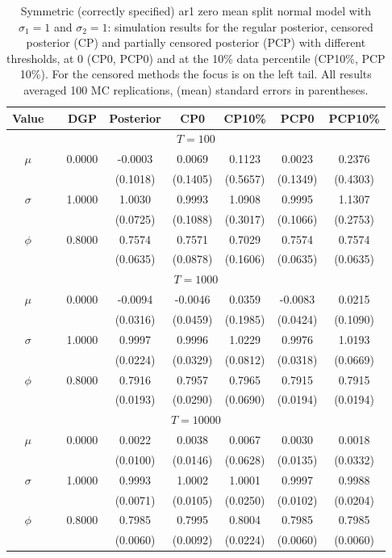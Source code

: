 { \renewcommand{\arraystretch}{1.2} 
{\footnotesize 
\begin{table} 
\center 
\begin{tabular}{cc cccccc} 
Value & & DGP & Posterior & CP0  & CP10\% & PCP0  & PCP10\% \\ \hline 
\hline 
\multicolumn{8}{c}{$T =100$}  \\ 
\hline 
\rowcolor{LightCyan} 
$\mu$&& 0.0000 & -0.0003 & 0.0069 & 0.1123 & 0.0023 & 0.2376 \\ 
&&   & (0.1018) & (0.1405) & (0.5657) & (0.1349) & (0.4303) \\ [1ex]
\rowcolor{LightCyan} 
$\sigma$&& 1.0000 & 1.0030 & 0.9993 & 1.0908 & 0.9995 & 1.1307 \\ 
&&   & (0.0725) & (0.1088) & (0.3017) & (0.1066) & (0.2753) \\ [1ex]
\rowcolor{LightCyan} 
$\phi$&& 0.8000 & 0.7574 & 0.7571 & 0.7029 & 0.7574 & 0.7574 \\ 
&&   & (0.0635) & (0.0878) & (0.1606) & (0.0635) & (0.0635) \\ [1ex]
\hline 
\multicolumn{8}{c}{$T =1000$}  \\ 
\hline 
\rowcolor{LightCyan} 
$\mu$&& 0.0000 & -0.0094 & -0.0046 & 0.0359 & -0.0083 & 0.0215 \\ 
&&   & (0.0316) & (0.0459) & (0.1985) & (0.0424) & (0.1090) \\ [1ex]
\rowcolor{LightCyan} 
$\sigma$&& 1.0000 & 0.9997 & 0.9996 & 1.0229 & 0.9976 & 1.0193 \\ 
&&   & (0.0224) & (0.0329) & (0.0812) & (0.0318) & (0.0669) \\ [1ex]
\rowcolor{LightCyan} 
$\phi$&& 0.8000 & 0.7916 & 0.7957 & 0.7965 & 0.7915 & 0.7915 \\ 
&&   & (0.0193) & (0.0290) & (0.0690) & (0.0194) & (0.0194) \\ [1ex]
\hline 
\multicolumn{8}{c}{$T =10000$}  \\ 
\hline 
\rowcolor{LightCyan} 
$\mu$&& 0.0000 & 0.0022 & 0.0038 & 0.0067 & 0.0030 & 0.0018 \\ 
&&   & (0.0100) & (0.0146) & (0.0628) & (0.0135) & (0.0332) \\ [1ex]
\rowcolor{LightCyan} 
$\sigma$&& 1.0000 & 0.9993 & 1.0002 & 1.0001 & 0.9997 & 0.9988 \\ 
&&   & (0.0071) & (0.0105) & (0.0250) & (0.0102) & (0.0204) \\ [1ex]
\rowcolor{LightCyan} 
$\phi$&& 0.8000 & 0.7985 & 0.7995 & 0.8004 & 0.7985 & 0.7985 \\ 
&&   & (0.0060) & (0.0092) & (0.0224) & (0.0060) & (0.0060) \\ [1ex]
\hline 
\end{tabular}
 \caption{Symmetric (correctly specified) ar1 zero mean split normal model with $\sigma_{1} = 1$ and $\sigma_{2} = 1$:  simulation results for the regular posterior, censored posterior (CP)  and partially censored posterior (PCP) with different thresholds,  at $0$ (CP0, PCP0) and at the 10\% data percentile (CP10\%, PCP 10\%).  For the censored methods the focus is on the left tail.  All results averaged 100 MC replications, (mean) standard errors in parentheses.} 
\label{tab:ar1_s1_pcp_est}  
\end{table}
}}
